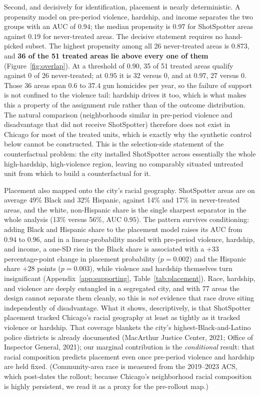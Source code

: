 \documentclass[12pt]{article}
\begin{document}
Second, and decisively for identification, placement is nearly deterministic. A propensity
model on pre-period violence, hardship, and income separates the two groups with an AUC of
$0.94$; the median propensity is $0.97$ for ShotSpotter areas against $0.19$ for
never-treated areas. The decisive statement requires no hand-picked subset. The highest
propensity among all 26 never-treated areas is $0.873$, and \textbf{36 of the 51 treated
areas lie above every one of them} (Figure~\ref{fig:overlap}). At a threshold of $0.90$, 35
of 51 treated areas qualify against $0$ of 26 never-treated; at $0.95$ it is 32 versus $0$,
and at $0.97$, 27 versus $0$. Those 36 areas span $0.6$ to $37.4$ gun homicides per year, so
the failure of support is not confined to the violence tail: hardship drives it too, which
is what makes this a property of the assignment rule rather than of the outcome
distribution. The natural comparison (neighborhoods similar in pre-period violence and
disadvantage that did not receive ShotSpotter) therefore does not exist in Chicago for most
of the treated units, which is exactly why the synthetic control below cannot be
constructed. This is the selection-side statement of the counterfactual problem: the city
installed ShotSpotter across essentially the whole high-hardship, high-violence region,
leaving no comparably situated untreated unit from which to build a counterfactual for it.

Placement also mapped onto the city's racial geography. ShotSpotter areas are on average
49\% Black and 32\% Hispanic, against 14\% and 17\% in never-treated areas, and the white,
non-Hispanic share is the single sharpest separator in the whole analysis (13\% versus
56\%, AUC $0.95$). The pattern survives conditioning: adding Black and Hispanic share to the
placement model raises its AUC from $0.94$ to $0.96$, and in a linear-probability model with
pre-period violence, hardship, and income, a one-SD rise in the Black share is associated
with a $+33$ percentage-point change in placement probability ($p = 0.002$) and the Hispanic
share $+28$ points ($p = 0.003$), while violence and hardship themselves turn insignificant
(Appendix~\ref{app:supporting}, Table~\ref{tab:placement}).
Race, hardship, and violence are deeply entangled in a segregated city, and with 77 areas the
design cannot separate them cleanly, so this is \emph{not} evidence that race drove siting
independently of disadvantage. What it shows, descriptively, is that ShotSpotter placement
tracked Chicago's racial geography at least as tightly as it tracked violence or hardship.
That coverage blankets the city's highest-Black-and-Latino police districts is already
documented (MacArthur Justice Center, 2021; Office of Inspector General, 2021); our marginal
contribution is the \emph{conditional} result: that racial composition predicts placement
even once pre-period violence and hardship are held fixed. (Community-area race is measured
from the 2019--2023 ACS, which post-dates the rollout; because Chicago's neighborhood racial
composition is highly persistent, we read it as a proxy for the pre-rollout map.)
\end{document}
